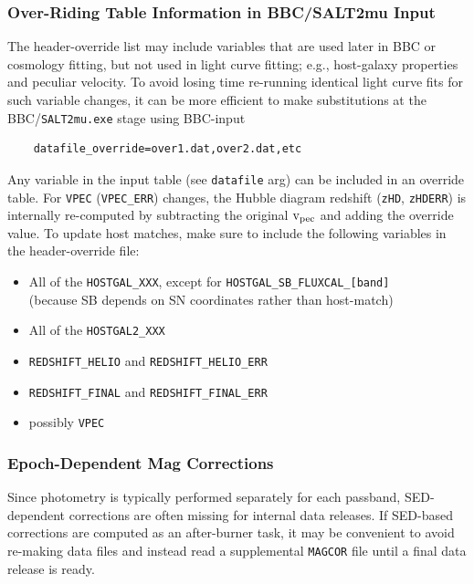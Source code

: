 \documentclass[12pt]{article}
\newcommand{\vpec}{{\rm v}_{\rm pec}}
\begin{document}
\subsubsection{Over-Riding Table Information in BBC/SALT2mu Input }
\label{sss:bbc_override}


The header-override list may include variables that are used later in 
BBC or cosmology fitting, but not used in light curve fitting;
e.g., host-galaxy properties and peculiar velocity. To avoid 
losing time re-running identical light curve fits for such variable changes,
it can be more efficient to make substitutions at the 
BBC/{\tt SALT2mu.exe} stage using BBC-input 
\vspace{-0.2cm}
\begin{verbatim}
    datafile_override=over1.dat,over2.dat,etc
\end{verbatim}
Any variable in the input table (see {\tt datafile} arg) can be
included in an override table.
For {\tt VPEC} ({\tt VPEC\_ERR}) changes, the Hubble diagram 
redshift ({\tt zHD}, {\tt zHDERR}) is internally re-computed by subtracting
the original $\vpec$ and adding the override value.
To update host matches, make sure to include the following variables
in the header-override file:
\vspace{-0.1cm}
\begin{itemize}[noitemsep]
   \item All of the {\tt HOSTGAL\_XXX},
            except for {\tt HOSTGAL\_SB\_FLUXCAL\_[band]} \\
     (because SB depends on SN coordinates rather than host-match)
   \item All of the {\tt HOSTGAL2\_XXX}
   \item {\tt REDSHIFT\_HELIO} and {\tt REDSHIFT\_HELIO\_ERR}
   \item {\tt REDSHIFT\_FINAL} and {\tt REDSHIFT\_FINAL\_ERR}
   \item possibly {\tt VPEC}
\end{itemize}

\clearpage
\subsubsection{Epoch-Dependent Mag Corrections}
\label{sss:magcor}

Since photometry is typically performed separately for each passband,
SED-dependent corrections are often missing for internal data
releases. If SED-based corrections are computed as an after-burner
task, it may be convenient to avoid re-making data files and instead
read a supplemental {\tt MAGCOR} file until a final data release is ready.
\end{document}

